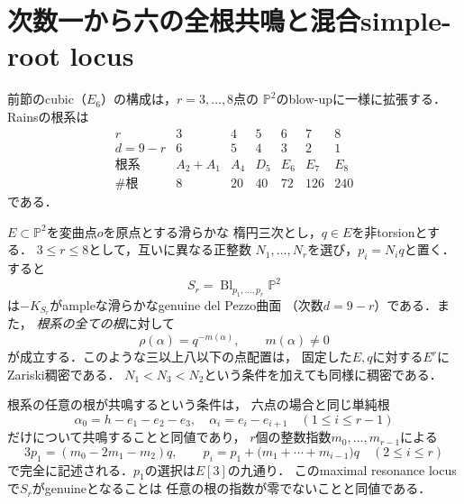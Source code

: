 \section{次数一から六の全根共鳴と混合simple-root locus}
\label{sec:maximal-all-degrees}
前節のcubic（$E_6$）の構成は，$r=3,\ldots,8$点の
$\mathbb P^2$のblow-upに一様に拡張する．
Rains\cite[\S4, (4.15)]{RainsFiltered}の根系は
\[
 \begin{array}{c|rrrrrr}
 r&3&4&5&6&7&8\\\hline
 d=9-r&6&5&4&3&2&1\\
 \text{根系}&A_2+A_1&A_4&D_5&E_6&E_7&E_8\\
 \#\text{根}&8&20&40&72&126&240
 \end{array}
\]
である．

\begin{theorem}[全次数における最大根共鳴の稠密性]
\label{thm:all-degree-maximal}
$E\subset\mathbb P^2$を変曲点$o$を原点とする滑らかな
楕円三次とし，$q\in E$を非torsionとする．
$3\le r\le8$として，互いに異なる正整数
$N_1,\ldots,N_r$を選び，$p_i=N_iq$と置く．
すると
\[
 S_r=\operatorname{Bl}_{p_1,\ldots,p_r}\mathbb P^2
\]
は$-K_{S_r}$がampleな滑らかなgenuine del Pezzo曲面
（次数$d=9-r$）である．また，
\emph{根系の全ての根}に対して
\[
 \rho(\alpha)=q^{-m(\alpha)},\qquad m(\alpha)\ne0
\]
が成立する．このような三以上八以下の点配置は，
固定した$E,q$に対する$E^r$にZariski稠密である．
$N_1<N_3<N_2$という条件を加えても同様に稠密である．

根系の任意の根が共鳴するという条件は，
六点の場合と同じ単純根
\[
 \alpha_0=h-e_1-e_2-e_3,\quad
 \alpha_i=e_i-e_{i+1}\quad(1\le i\le r-1)
\]
だけについて共鳴することと同値であり，
$r$個の整数指数$m_0,\ldots,m_{r-1}$による
\begin{equation}\label{eq:all-degree-chart}
 3p_1=(m_0-2m_1-m_2)q,\qquad
 p_i=p_1+\bigl(m_1+\cdots+m_{i-1}\bigr)q
 \quad(2\le i\le r)
\end{equation}
で完全に記述される．$p_1$の選択は$E[3]$の九通り．
このmaximal resonance locusで$S_r$がgenuineとなることは
任意の根の指数が零でないことと同値である．
\end{theorem}
